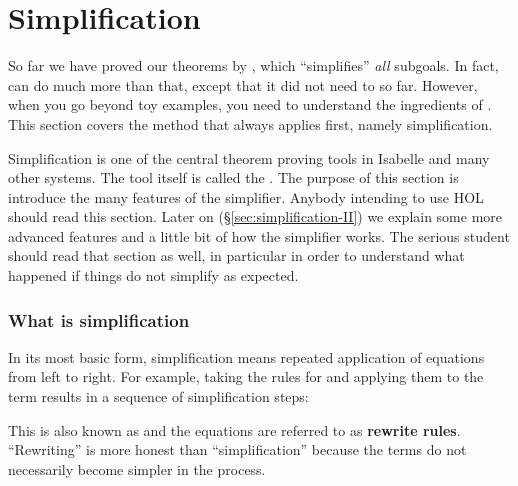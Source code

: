 \section{Simplification}
\label{sec:Simplification}

So far we have proved our theorems by , which ``simplifies''
\emph{all} subgoals. In fact,  can do much more than that, except
that it did not need to so far. However, when you go beyond toy examples, you
need to understand the ingredients of .  This section covers the
method that  always applies first, namely simplification.

Simplification is one of the central theorem proving tools in Isabelle and
many other systems. The tool itself is called the . The
purpose of this section is introduce the many features of the simplifier.
Anybody intending to use HOL should read this section. Later on
(\S\ref{sec:simplification-II}) we explain some more advanced features and a
little bit of how the simplifier works. The serious student should read that
section as well, in particular in order to understand what happened if things
do not simplify as expected.

\subsubsection{What is simplification}

In its most basic form, simplification means repeated application of
equations from left to right. For example, taking the rules for \isa{\at}
and applying them to the term \isa{[0,1] \at\ []} results in a sequence of
simplification steps:
This is also known as  and the
equations are referred to as \textbf{rewrite rules}.
``Rewriting'' is more honest than ``simplification'' because the terms do not
necessarily become simpler in the process.






\begin{exercise}
%
\end{exercise}

